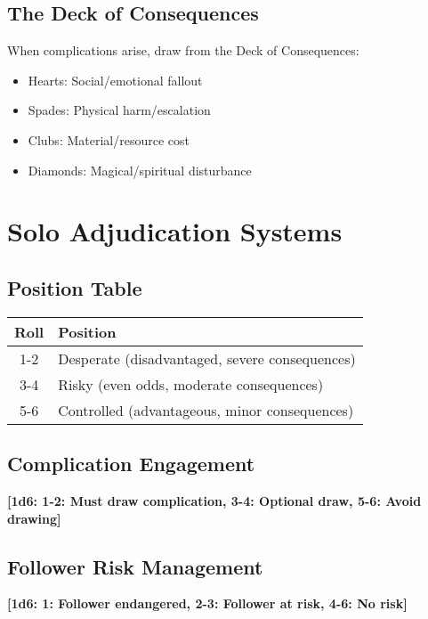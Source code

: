 \documentclass[11pt]{article}
\newcommand{\dice}[1]{\textbf{[1d6: #1]}}
\begin{document}
\subsection{The Deck of Consequences}

When complications arise, draw from the Deck of Consequences:
\begin{itemize}
    \item Hearts: Social/emotional fallout
    \item Spades: Physical harm/escalation
    \item Clubs: Material/resource cost
    \item Diamonds: Magical/spiritual disturbance
\end{itemize}

\section{Solo Adjudication Systems}

\subsection{Position Table}

\begin{center}
\begin{tabular}{cl}
\toprule
\textbf{Roll} & \textbf{Position} \\
\midrule
1-2 & Desperate (disadvantaged, severe consequences) \\
3-4 & Risky (even odds, moderate consequences) \\
5-6 & Controlled (advantageous, minor consequences) \\
\bottomrule
\end{tabular}
\end{center}

\subsection{Complication Engagement}

\dice{1-2: Must draw complication, 3-4: Optional draw, 5-6: Avoid drawing}

\subsection{Follower Risk Management}

\dice{1: Follower endangered, 2-3: Follower at risk, 4-6: No risk}
\end{document}
